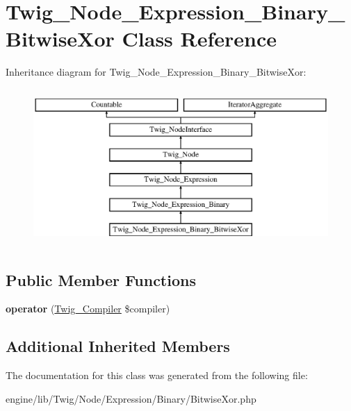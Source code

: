\hypertarget{class_twig___node___expression___binary___bitwise_xor}{}\section{Twig\+\_\+\+Node\+\_\+\+Expression\+\_\+\+Binary\+\_\+\+Bitwise\+Xor Class Reference}
\label{class_twig___node___expression___binary___bitwise_xor}
Inheritance diagram for Twig\+\_\+\+Node\+\_\+\+Expression\+\_\+\+Binary\+\_\+\+Bitwise\+Xor\+:\begin{figure}[H]
\begin{center}
\leavevmode
\includegraphics[height=6.000000cm]{class_twig___node___expression___binary___bitwise_xor}
\end{center}
\end{figure}
\subsection*{Public Member Functions}
\begin{DoxyCompactItemize}
\item 
\hypertarget{class_twig___node___expression___binary___bitwise_xor_af77318ec88d5f8a508684970a150b670}{}{\bfseries operator} (\hyperlink{class_twig___compiler}{Twig\+\_\+\+Compiler} \$compiler)\label{class_twig___node___expression___binary___bitwise_xor_af77318ec88d5f8a508684970a150b670}

\end{DoxyCompactItemize}
\subsection*{Additional Inherited Members}


The documentation for this class was generated from the following file\+:\begin{DoxyCompactItemize}
\item 
engine/lib/\+Twig/\+Node/\+Expression/\+Binary/Bitwise\+Xor.\+php\end{DoxyCompactItemize}

